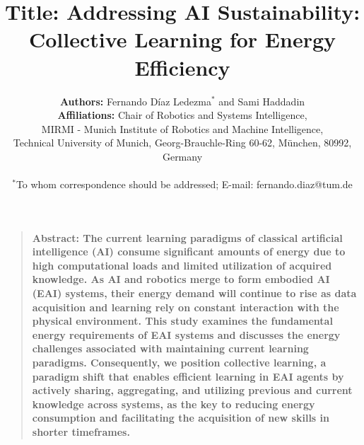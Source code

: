 \documentclass[12pt]{article}
\title{\textbf{Title:} Addressing AI Sustainability: Collective Learning for Energy Efficiency}
\author
{\textbf{Authors:} Fernando D\'iaz Ledezma$^{\ast}$ and Sami Haddadin
	\\
	\normalsize{\textbf{Affiliations:} Chair of Robotics and Systems Intelligence,}\\
	\normalsize{MIRMI - Munich Institute of Robotics and Machine Intelligence,}\\
	\normalsize{Technical University of Munich, Georg-Brauchle-Ring 60-62, M\"unchen, 80992, Germany}\\
	\\
	\normalsize{$^\ast$To whom correspondence should be addressed; E-mail: fernando.diaz@tum.de}
}
\date{}
\newenvironment{sciabstract}{%
\begin{quote} \bf}
{\end{quote}}
\begin{document}
 

\baselineskip24pt


\maketitle 



\begin{sciabstract}
	\textbf{Abstract:} The current learning paradigms of classical artificial intelligence (AI) consume significant amounts of energy due to high computational loads and limited utilization of acquired knowledge. As AI and robotics merge to form embodied AI (EAI) systems, their energy demand will continue to rise as data acquisition and learning rely on constant interaction with the physical environment. This study examines the fundamental energy requirements of EAI systems and discusses the energy challenges associated with maintaining current learning paradigms. Consequently, we position collective learning, a paradigm shift that enables efficient learning in EAI agents by actively sharing, aggregating, and utilizing previous and current knowledge across systems, as the key to reducing energy consumption and facilitating the acquisition of new skills in shorter timeframes.
\end{sciabstract}


\end{document}
